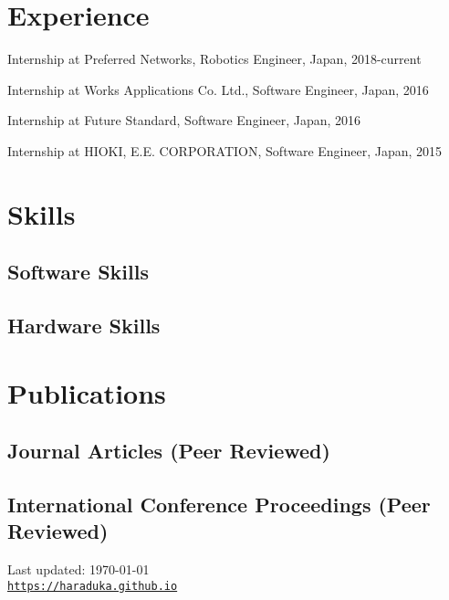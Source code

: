 \documentclass[letterpaper]{article}
\def\footerlink{https://haraduka.github.io}
\renewenvironment{itemize}{
  \begin{list}{}{
    \setlength{\leftmargin}{1.5em}
  }
}{
  \end{list}
}
\begin{document}
\section*{Experience}

\begin{itemize}
  \item Internship at Preferred Networks, Robotics Engineer, Japan, 2018-current
  \item Internship at Works Applications Co. Ltd., Software Engineer, Japan, 2016
  \item Internship at Future Standard, Software Engineer, Japan, 2016
  \item Internship at HIOKI, E.E. CORPORATION, Software Engineer, Japan, 2015
\end{itemize}

\section*{Skills}

\subsection*{Software Skills}

\subsection*{Hardware Skills}

\section*{Publications}

\subsection*{Journal Articles (Peer Reviewed)}


\subsection*{International Conference Proceedings (Peer Reviewed)}



\bigskip

\begin{center}
  \begin{footnotesize}
    Last updated: \today \\
    \href{\footerlink}{\texttt{\footerlink}}
  \end{footnotesize}
\end{center}
\end{document}
